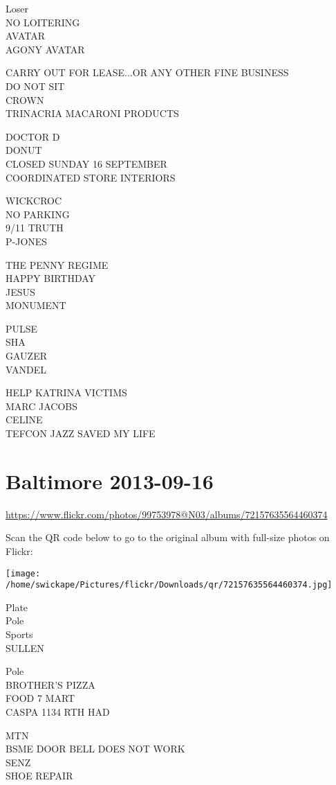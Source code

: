 \documentclass[10pt,letterpaper]{article}
\begin{document}
Loser\\
NO LOITERING\\
AVATAR\\
AGONY AVATAR

CARRY OUT FOR LEASE...OR ANY OTHER FINE BUSINESS\\
DO NOT SIT\\
CROWN\\
TRINACRIA MACARONI PRODUCTS

DOCTOR D\\
DONUT\\
CLOSED SUNDAY 16 SEPTEMBER\\
COORDINATED STORE INTERIORS

WICKCROC\\
NO PARKING\\
9/11 TRUTH\\
P{-}JONES

THE PENNY REGIME\\
HAPPY BIRTHDAY\\
JESUS\\
MONUMENT

PULSE\\
SHA\\
GAUZER\\
VANDEL

HELP KATRINA VICTIMS\\
MARC JACOBS\\
CELINE\\
TEFCON JAZZ SAVED MY LIFE


\section*{Baltimore 2013-09-16}

\url{https://www.flickr.com/photos/99753978@N03/albums/72157635564460374}

Scan the QR code below to go to the original album with full-size photos on Flickr:

\texttt{[image: /home/swickape/Pictures/flickr/Downloads/qr/72157635564460374.jpg]}


Plate\\
Pole\\
Sports\\
SULLEN

Pole\\
BROTHER'S PIZZA\\
FOOD 7 MART\\
CASPA 1134 RTH HAD

MTN\\
BSME DOOR BELL DOES NOT WORK\\
SENZ\\
SHOE REPAIR
\end{document}
